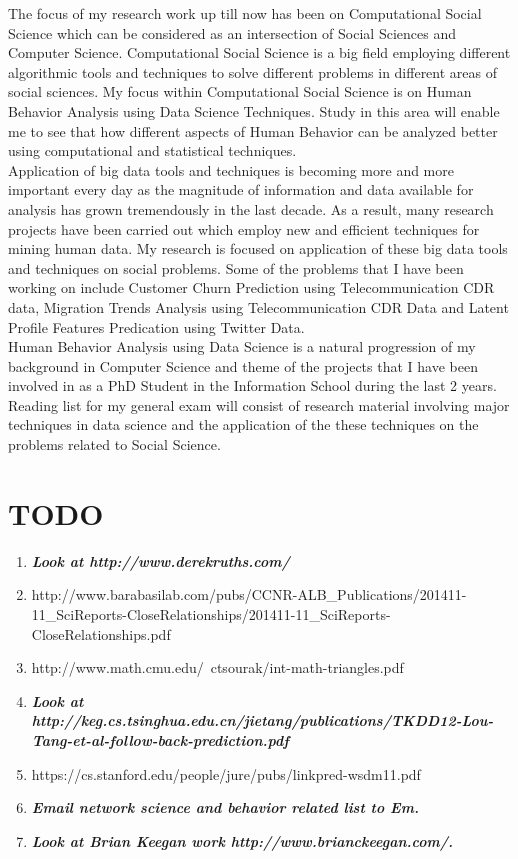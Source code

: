 
The focus of my research work up till now has been on Computational Social Science which can be considered as an intersection of Social Sciences and Computer Science. Computational Social Science is a big field employing different algorithmic tools and techniques to solve different problems in different areas of social sciences. My focus within Computational Social Science is on Human Behavior Analysis using Data Science Techniques. Study in this area will enable me to see that how different aspects of Human Behavior can be analyzed better using computational and statistical techniques.\\

Application of big data tools and techniques is becoming more and more important every day as the magnitude of information and data available for analysis has grown tremendously in the last decade. As a result, many research projects have been carried out which employ new and efficient techniques for mining human data. My research is focused on application of these big data tools and techniques on social problems. Some of the problems that I have been working on include Customer Churn Prediction using Telecommunication CDR data, Migration Trends Analysis using Telecommunication CDR Data and Latent Profile Features Predication using Twitter Data.\\ 

Human Behavior Analysis using Data Science is a natural progression of my background in Computer Science and theme of the projects that I have been involved in as a PhD Student in the Information School during the last 2 years.   Reading list for my general exam will consist of research material involving major techniques in data science and the application of the these techniques on the problems related to Social Science. 
\\
\section{TODO}
\begin{enumerate}
\item \textbf{\textit{Look at http://www.derekruths.com/}}
\item http://www.barabasilab.com/pubs/CCNR-ALB_Publications/201411-11_SciReports-CloseRelationships/201411-11_SciReports-CloseRelationships.pdf
\item http://www.math.cmu.edu/~ctsourak/int-math-triangles.pdf
\item \textbf{\textit{Look at http://keg.cs.tsinghua.edu.cn/jietang/publications/TKDD12-Lou-Tang-et-al-follow-back-prediction.pdf}}
\item https://cs.stanford.edu/people/jure/pubs/linkpred-wsdm11.pdf
\item \textbf{\textit{Email network science and behavior related list to Em.}}

\item \textbf{\textit{Look at Brian Keegan work http://www.brianckeegan.com/.}}
\end{enumerate}
